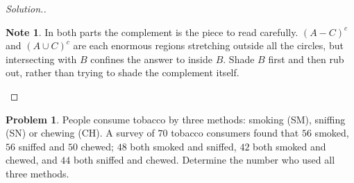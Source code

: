 \documentclass[11pt,a4paper]{article}
\theoremstyle{definition}
\newtheorem{note}[thm]{Note}
\newtheorem{problemx}{Problem}[section]
\newenvironment{problem}{\begin{problemx}}{\end{problemx}}
\newenvironment{solution}
  {\renewcommand{\qedsymbol}{}\begin{proof}[\textit{Solution}.]}
  {\end{proof}}
\begin{document}
\begin{solution}
\begin{note}
In both parts the complement is the piece to read carefully. $(A-C)^c$ and $(A\cup C)^c$
are each enormous regions stretching outside all the circles, but intersecting with $B$
confines the answer to inside $B$. Shade $B$ first and then rub out, rather than trying
to shade the complement itself.
\end{note}
\end{solution}

\begin{problem}
People consume tobacco by three methods: smoking (SM), sniffing (SN) or chewing (CH). A
survey of $70$ tobacco consumers found that $56$ smoked, $56$ sniffed and $50$ chewed;
$48$ both smoked and sniffed, $42$ both smoked and chewed, and $44$ both sniffed and
chewed. Determine the number who used all three methods.
\end{problem}
\end{document}
